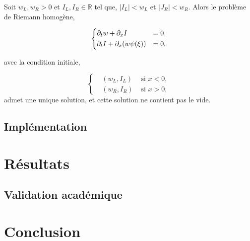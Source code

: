 \begin{theorem}
Soit $w_L,w_R >0$ et $I_L, I_R\in \mathbb{R}$ tel que, $|I_L| < w_L$ et 
$|J_R| < w_R$. Alors le problème de Riemann homogène,  

\begin{equation}
\label{eq:sysh}
\left\{
\begin{aligned}
&\partial_t w + \partial_x I &= 0,\\
&\partial_t I + \partial_x ( w\psi(\xi)) &= 0,
\end{aligned}
\right.
\end{equation}

avec la condition initiale,

\begin{equation}
\label{eq:sysh}
\left\{
\begin{aligned}
&(w_L, I_L) & \mbox{ si } x<0,\\
&(w_R, I_R) & \mbox{ si } x>0,
\end{aligned}
\right.
\end{equation}
admet une unique solution, et cette solution ne contient pas le vide.
\end{theorem}

\subsection{Implémentation}
\section{Résultats}
\subsection{Validation académique}
\section{Conclusion}

